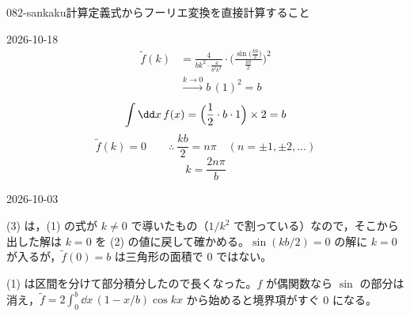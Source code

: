 \documentclass[uplatex,dvipdfmx,a4paper,11pt]{jsarticle}
\begin{document}
\begin{mondai}{082-sankaku}{計算}{定義式からフーリエ変換を直接計算すること}
\begin{kotaeutsushi}{2026-10-18}
\begin{align*}
  \tilde f(k)&=\frac{4}{bk^{2}\cdot\frac{4}{b^{2}k^{2}}}\cdot\Biggl(\frac{\sin\bigl(\frac{kb}{2}\bigr)}{\frac{kb}{2}}\Biggr)^{2}\\
  &\xrightarrow{k\to0}b\,(1)^{2}=b
\end{align*}
\[ \int\dd x\,f(x)=\Bigl(\frac{1}{2}\cdot b\cdot1\Bigr)\times2=b \]
\[ \tilde f(k)=0\qquad\therefore\ \frac{kb}{2}=n\pi\quad(n=\pm1,\pm2,\dots) \]
\[ k=\frac{2n\pi}{b} \]
\end{kotaeutsushi}
\begin{maekizuki}{2026-10-03}
\item (3) は，(1) の式が $k\neq0$ で導いたもの（$1/k^{2}$ で割っている）なので，そこから出した解は $k=0$ を (2) の値に戻して確かめる。$\sin(kb/2)=0$ の解に $k=0$ が入るが，$\tilde f(0)=b$ は三角形の面積で 0 ではない。
\item (1) は区間を分けて部分積分したので長くなった。$f$ が偶関数なら $\sin$ の部分は消え，$\tilde f=2\int_{0}^{b}\dd x\,(1-x/b)\cos kx$ から始めると境界項がすぐ 0 になる。
\end{maekizuki}
\end{mondai}
\end{document}
